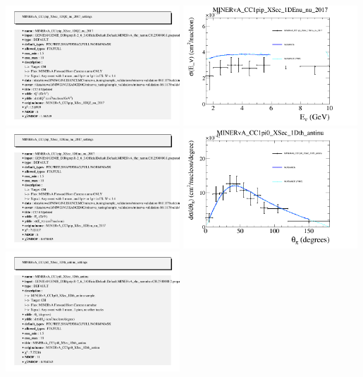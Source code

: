 \documentclass{article}
\begin{document}
\includegraphics[width=0.49\textwidth]{figures/nuisance_MINERvA_CC1pip_XSec_1DQ2_nu_2017_info.png}
\centering
\includegraphics[width=0.49\textwidth]{figures/nuisance_MINERvA_CC1pip_XSec_1DEnu_nu_2017_comp.png}
\includegraphics[width=0.49\textwidth]{figures/nuisance_MINERvA_CC1pip_XSec_1DEnu_nu_2017_info.png}
\centering
\includegraphics[width=0.49\textwidth]{figures/nuisance_MINERvA_CC1pi0_XSec_1Dth_antinu_comp.png}
\includegraphics[width=0.49\textwidth]{figures/nuisance_MINERvA_CC1pi0_XSec_1Dth_antinu_info.png}
\end{document}

